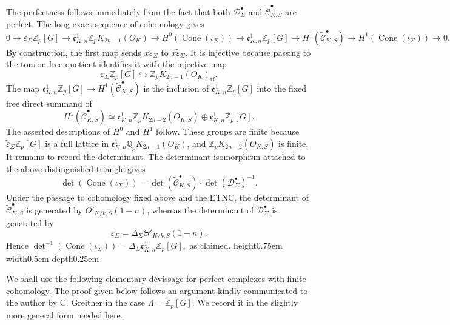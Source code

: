 \documentclass[a4paper,11pt]{article}
\newenvironment{proof}[1][Proof]{\begin{trivlist}
\item[\hskip \labelsep {\bfseries #1}]}{\end{trivlist}}
\newcommand{\qed}{\nobreak \ifvmode \relax \else
    \ifdim\lastskip<1.5em \hskip-\lastskip
     \hskip1.5em plus0em minus0.5em \fi \nobreak
      \vrule height0.75em width0.5em depth0.25em\fi}
\begin{document}
\begin{proof}
The perfectness follows immediately from the fact that both
\(\mathcal D_{\Sigma}^{\bullet}\) and
\(\widetilde{\mathcal C}_{K,S}^{\bullet}\) are perfect. The long exact
sequence of cohomology gives
\[
0\to
\varepsilon_{\Sigma}\mathbb Z_p[G]
\to
\mathfrak e^1_{K,n}\mathbb Z_pK_{2n-1}(O_K)
\to
H^0(\operatorname{Cone}(\iota_{\Sigma}))
\to
\mathfrak e^1_{K,n}\mathbb Z_p[G]
\to
H^1(\widetilde{\mathcal C}_{K,S}^{\bullet})
\to
H^1(\operatorname{Cone}(\iota_{\Sigma}))
\to 0.
\]
By construction, the first map sends
\(x\varepsilon_{\Sigma}\) to \(x\widetilde\varepsilon_{\Sigma}\). It is
injective because passing to the torsion-free quotient identifies it with the
injective map
\[
\varepsilon_{\Sigma}\mathbb Z_p[G]
\hookrightarrow
\mathbb Z_pK_{2n-1}(O_K)_{\mathrm{tf}}.
\]
The map $\mathfrak e^1_{K,n}\mathbb Z_p[G]
\to
H^1(\widetilde{\mathcal C}_{K,S}^{\bullet})$ is the inclusion of
\(\mathfrak e^1_{K,n}\mathbb Z_p[G]\) into the fixed free direct summand of
\[
H^1(\widetilde{\mathcal C}_{K,S}^{\bullet})
\simeq
\mathfrak e^1_{K,n}\mathbb Z_pK_{2n-2}(O_{K,S})
\oplus
\mathfrak e^1_{K,n}\mathbb Z_p[G].
\]
The asserted descriptions of \(H^0\) and \(H^1\) follow. These groups are
finite because
\(\widetilde\varepsilon_{\Sigma}\mathbb Z_p[G]\) is a full lattice in
\(\mathfrak e^1_{K,n}\mathbb Q_pK_{2n-1}(O_K)\), and
\(\mathbb Z_pK_{2n-2}(O_{K,S})\) is finite.
It remains to record the determinant. The determinant isomorphism attached to
the above distinguished triangle gives
\[
\operatorname{det}(\operatorname{Cone}(\iota_{\Sigma}))
=
\operatorname{det}(\widetilde{\mathcal C}_{K,S}^{\bullet})
\cdot
\operatorname{det}(\mathcal D_{\Sigma}^{\bullet})^{-1}.
\]
Under the passage to cohomology fixed above and the ETNC, the determinant of
\(\widetilde{\mathcal C}_{K,S}^{\bullet}\) is generated by
\(\Theta'_{K/k,S}(1-n)\), whereas the determinant of
\(\mathcal D_{\Sigma}^{\bullet}\) is generated by
\[
\varepsilon_{\Sigma}
=
\Delta_{\Sigma}\Theta'_{K/k,S}(1-n).
\]
Hence
\(
\operatorname{det}^{-1}(\operatorname{Cone}(\iota_{\Sigma}))
=
\Delta_{\Sigma}
\mathfrak e^1_{K,n}\mathbb Z_p[G],
\)
as claimed.\qed
\end{proof}
We shall use the following elementary dévissage for perfect complexes with
finite cohomology. The proof given below follows an argument
kindly communicated to the author by C. Greither in the case \(\Lambda=\mathbb Z_p[G]\). We record it in the
slightly more general form needed here.
\end{document}
